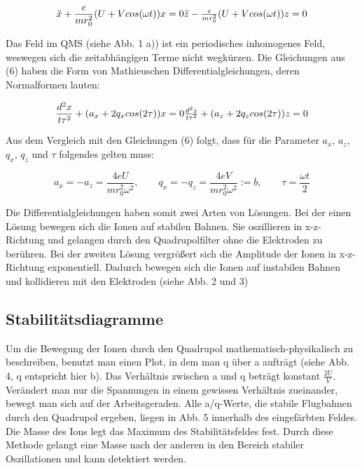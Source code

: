 \begin{equation}
\ddot{x} + \frac{e}{mr_{0}^{2}}(U+V cos (\omega t)) x = 0
$$\\$$
\ddot{z} - \frac{e}{mr_{0}^{2}}(U+V cos (\omega t)) z = 0
\end{equation}

Das Feld im QMS (siehe Abb. 1 a)) ist ein periodisches inhomogenes Feld, weswegen sich die zeitabhängigen Terme nicht wegkürzen. Die Gleichungen aus (6) haben die Form von Mathieuschen Differentialgleichungen, deren Normalformen lauten:

\begin{equation}
\frac{d^{2}x}{t\tau^{2}}+(a_{x}+2q_{x}cos (2\tau)) x = 0
$$\\$$
\frac{d^{2}z}{t\tau^{2}}+(a_{z}+2q_{z}cos (2\tau)) z = 0
\end{equation}

Aus dem Vergleich mit den Gleichungen (6) folgt, dass für die Parameter $a_{x}$, $a_{z}$, $q_{x}$, $q_{z}$ und $\tau$ folgendes gelten muss:

\begin{equation}
a_{x} = -a_{z} = \frac{4eU}{mr_{0}^{2}\omega^{2}},\qquad q_{x}= -q_{z}= \frac{4eV}{mr_{0}^{2}\omega^{2}} := b,\qquad \tau =\frac{\omega t}{2}
\end{equation}

Die Differentialgleichungen haben somit zwei Arten von Lösungen. Bei der einen Lösung bewegen sich die Ionen auf stabilen Bahnen. Sie oszillieren in x-z-Richtung und gelangen durch den Quadrupolfilter ohne die Elektroden zu berühren. Bei der zweiten Lösung vergrößert sich die Amplitude der Ionen in x-z-Richtung exponentiell. Dadurch bewegen sich die Ionen auf instabilen Bahnen und kollidieren mit den Elektroden (siehe Abb. 2 und 3)



\subsection{Stabilitätsdiagramme}
Um die Bewegung der Ionen durch den Quadrupol mathematisch-physikalisch zu beschreiben, benutzt man einen Plot, in dem man q über a aufträgt (siehe Abb. 4, q entspricht hier b). Das Verhältnis zwischen a und q beträgt konstant $\frac{2U}{V}$. Verändert man nur die Spannungen in einem gewissen Verhältnis zueinander, bewegt man sich auf der Arbeitsgeraden. Alle a/q-Werte, die stabile Flugbahnen durch den Quadrupol ergeben, liegen in Abb. 5 innerhalb des eingefärbten Feldes. Die Masse des Ions legt das Maximum des Stabilitätsfeldes fest. Durch diese Methode gelangt eine Masse nach der anderen in den Bereich stabiler Oszillationen und kann detektiert werden.

